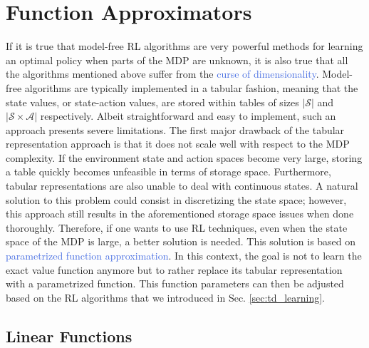 \section{Function Approximators}
\label{sec:function_approximators}
If it is true that model-free RL algorithms are very powerful methods for learning an optimal policy when parts of the MDP are unknown, it is also true that all the algorithms mentioned above suffer from the \textcolor{RoyalBlue}{curse of dimensionality}. Model-free algorithms are typically implemented in a tabular fashion, meaning that the state values, or state-action values, are stored within tables of sizes $|\mathcal{S}|$ and $|\mathcal{S}\times\mathcal{A}|$ respectively. Albeit straightforward and easy to implement, such an approach presents severe limitations. The first major drawback of the tabular representation approach is that it does not scale well with respect to the MDP complexity. If the environment state and action spaces become very large, storing a table quickly becomes unfeasible in terms of storage space. Furthermore, tabular representations are also unable to deal with continuous states. A natural solution to this problem could consist in discretizing the state space; however, this approach still results in the aforementioned storage space issues when done thoroughly. Therefore, if one wants to use RL techniques, even when the state space of the MDP is large, a better solution is needed. This solution is based on \textcolor{RoyalBlue}{parametrized function approximation}. In this context, the goal is not to learn the exact value function anymore but to rather replace its tabular representation with a parametrized function. This function parameters can then be adjusted based on the RL algorithms that we introduced in Sec. \ref{sec:td_learning}. 

\subsection{Linear Functions}
\label{sec:linear_functions}

